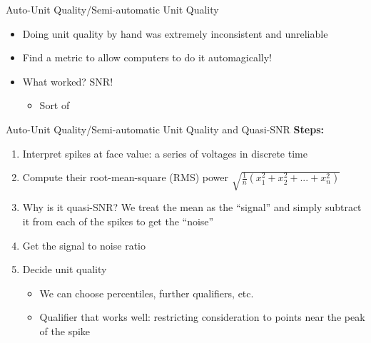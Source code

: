 \documentclass{beamer}
\begin{document}
    \begin{frame}{Auto-Unit Quality/Semi-automatic Unit Quality}
        \begin{itemize}
            \pause
            \item Doing unit quality by hand was extremely inconsistent and
unreliable
            \pause
            \item Find a metric to allow computers to do it automagically!
            \pause
            \item What worked? SNR!
            \pause
                \begin{itemize}
                    \item Sort of
                \end{itemize}
            \end{itemize}
    \end{frame}
    
    \begin{frame}{Auto-Unit Quality/Semi-automatic Unit Quality and Quasi-SNR}
        \textbf{Steps: }
        \begin{enumerate}
            \item Interpret spikes at face value: a series of voltages in
discrete time
            \pause
            \item Compute their root-mean-square (RMS) power
            \pause
            \ensuremath{\sqrt{\frac{1}{n}\left(x^2_1 + x^2_2 + ... +
x^2_n\right)}}
            \pause
            \item Why is it quasi-SNR? We treat the mean as the ``signal'' and
simply subtract it from each of the spikes to get the ``noise''
            \pause
            \item Get the signal to noise ratio
            \pause
            \item Decide unit quality
            \begin{itemize}
                \item We can choose percentiles, further qualifiers, etc.
                \pause
                \item Qualifier that works well: restricting consideration to
points near the peak of the spike
            \end{itemize}
        \end{enumerate}
    \end{frame}
\end{document}

